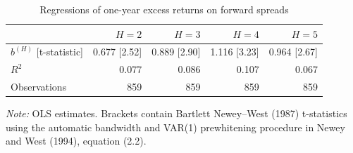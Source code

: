 \begin{table}[htbp]
\centering
\caption{Regressions of one-year excess returns on forward spreads}
\label{tab:q4c}
\begin{tabular}{lrrrr}
\toprule
 & $H=2$ & $H=3$ & $H=4$ & $H=5$ \\
\midrule
$b^{(H)}$ [t-statistic] & 0.677 [2.52] & 0.889 [2.90] & 1.116 [3.23] & 0.964 [2.67] \\
$R^2$ & 0.077 & 0.086 & 0.107 & 0.067 \\
Observations & 859 & 859 & 859 & 859 \\
\bottomrule
\end{tabular}
\begin{minipage}{0.92\textwidth}
\footnotesize\textit{Note:} OLS estimates. Brackets contain Bartlett Newey--West (1987) t-statistics using the automatic bandwidth and VAR(1) prewhitening procedure in Newey and West (1994), equation (2.2).
\end{minipage}
\end{table}
